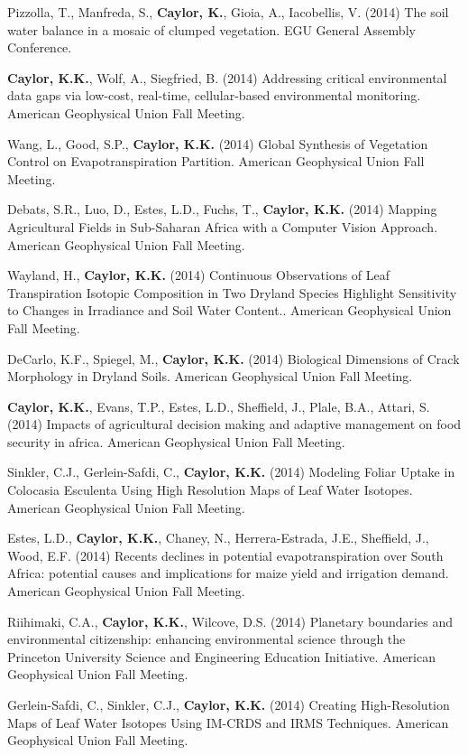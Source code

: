 \begin{etaremune}
\item Pizzolla, T., Manfreda, S., \textbf{ Caylor, K.}, Gioia, A., Iacobellis, V. (2014) The soil water balance in a mosaic of clumped vegetation. EGU General Assembly Conference.
\item \textbf{ Caylor, K.K.}, Wolf, A., Siegfried, B. (2014) Addressing critical environmental data gaps via low-cost, real-time, cellular-based environmental monitoring. American Geophysical Union Fall Meeting.
\item Wang, L., Good, S.P., \textbf{ Caylor, K.K.} (2014) Global Synthesis of Vegetation Control on Evapotranspiration Partition. American Geophysical Union Fall Meeting.
\item Debats, S.R., Luo, D., Estes, L.D., Fuchs, T., \textbf{ Caylor, K.K.} (2014) Mapping Agricultural Fields in Sub-Saharan Africa with a Computer Vision Approach. American Geophysical Union Fall Meeting.
\item Wayland, H., \textbf{ Caylor, K.K.} (2014) Continuous Observations of Leaf Transpiration Isotopic Composition in Two Dryland Species Highlight Sensitivity to Changes in Irradiance and Soil Water Content.. American Geophysical Union Fall Meeting.
\item DeCarlo, K.F., Spiegel, M., \textbf{ Caylor, K.K.} (2014) Biological Dimensions of Crack Morphology in Dryland Soils. American Geophysical Union Fall Meeting.
\item \textbf{ Caylor, K.K.}, Evans, T.P., Estes, L.D., Sheffield, J., Plale, B.A., Attari, S. (2014) Impacts of agricultural decision making and adaptive management on food security in africa. American Geophysical Union Fall Meeting.
\item Sinkler, C.J., Gerlein-Safdi, C., \textbf{ Caylor, K.K.} (2014) Modeling Foliar Uptake in Colocasia Esculenta Using High Resolution Maps of Leaf Water Isotopes. American Geophysical Union Fall Meeting.
\item Estes, L.D., \textbf{ Caylor, K.K.}, Chaney, N., Herrera-Estrada, J.E., Sheffield, J., Wood, E.F. (2014) Recents declines in potential evapotranspiration over South Africa: potential causes and implications for maize yield and irrigation demand. American Geophysical Union Fall Meeting.
\item Riihimaki, C.A., \textbf{ Caylor, K.K.}, Wilcove, D.S. (2014) Planetary boundaries and environmental citizenship: enhancing environmental science through the Princeton University Science and Engineering Education Initiative. American Geophysical Union Fall Meeting.
\item Gerlein-Safdi, C., Sinkler, C.J., \textbf{ Caylor, K.K.} (2014) Creating High-Resolution Maps of Leaf Water Isotopes Using IM-CRDS and IRMS Techniques. American Geophysical Union Fall Meeting.


\end{etaremune}
